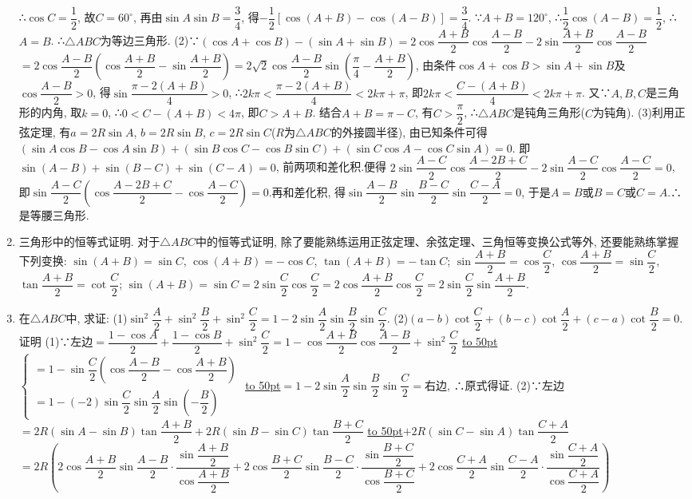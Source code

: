 \documentclass[10pt,a4paper]{article}
\newcommand{\blank}[1]{\underline{\hbox to #1pt{}}}
\begin{document}
\begin{enumerate}[1.]
∴$\cos C=\dfrac 12$, 故$C=60^{\circ }$, 再由$\sin A\sin B=\dfrac 34$, 得$-\dfrac 12[\cos (A+B)-\cos (A-B)]=\dfrac 34$.
∵$A+B=120^\circ$, ∴$\dfrac 12\cos (A-B)=\dfrac 12$, ∴$A=B$.
∴$\triangle ABC$为等边三角形.
(2)∵$(\cos A+\cos B)-(\sin A+\sin B)=2\cos \dfrac{A+B}2\cos \dfrac{A-B}2-2\sin \dfrac{A+B}2\cos \dfrac{A-B}2$
$=2\cos \dfrac{A-B}2(\cos \dfrac{A+B}2-\sin \dfrac{A+B}2)=2\sqrt 2\cos \dfrac{A-B}2\sin (\dfrac{\pi }4-\dfrac{A+B}2)$,
由条件$\cos A+\cos B>\sin A+\sin B$及$\cos \dfrac{A-B}2>0$, 得$\sin \dfrac{\pi -2(A+B)}4>0$,
∴$2k\pi <\dfrac{\pi -2(A+B)}4<2k\pi +\pi$, 即$2k\pi <\dfrac{C-(A+B)}4<2k\pi +\pi$.
又∵$A,B,C$是三角形的内角, 取$k=0$, ∴$0<C-(A+B)<4\pi$, 即$C>A+B$.
结合$A+B=\pi -C$, 有$C>\dfrac{\pi }2$, ∴$\triangle ABC$是钝角三角形($C$为钝角).
(3)利用正弦定理, 有$a=2R\sin A$, $b=2R\sin B$, $c=2R\sin C$($R$为$\triangle ABC$的外接圆半径), 由已知条件可得$(\sin A\cos B-\cos A\sin B)+(\sin B\cos C-\cos B\sin C)+(\sin C\cos A-\cos C\sin A)=0$.
即$\sin (A-B)+\sin (B-C)+\sin (C-A)=0$, 前两项和差化积.便得
$2\sin \dfrac{A-C}2\cos \dfrac{A-2B+C}2-2\sin \dfrac{A-C}2\cos \dfrac{A-C}2=0$,
即$\sin \dfrac{A-C}2(\cos \dfrac{A-2B+C}2-\cos \dfrac{A-C}2)=0$.再和差化积,
得$\sin \dfrac{A-B}2\sin \dfrac{B-C}2\sin \dfrac{C-A}2=0$, 于是$A=B$或$B=C$或$C=A$.∴是等腰三角形.
\item 三角形中的恒等式证明.
对于$\triangle ABC$中的恒等式证明, 除了要能熟练运用正弦定理、余弦定理、三角恒等变换公式等外, 还要能熟练掌握下列变换:
$\sin (A+B)=\sin C$, $\cos (A+B)=-\cos C$, $\tan (A+B)=-\tan C$;
$\sin \dfrac{A+B}2=\cos \dfrac C2$, $\cos \dfrac{A+B}2=\sin \dfrac C2$, $\tan \dfrac{A+B}2=\cot \dfrac C2$;
$\sin (A+B)=\sin C=2\sin \dfrac C2\cos \dfrac C2=2\cos \dfrac{A+B}2\cos \dfrac C2=2\sin \dfrac C2\sin \dfrac{A+B}2$.
\item 在$\triangle ABC$中, 求证:
(1)$\sin ^2\dfrac A2+\sin ^2\dfrac B2+\sin ^2\dfrac C2=1-2\sin \dfrac A2\sin \dfrac B2\sin \dfrac C2$.
(2)$(a-b)\cot \dfrac C2+(b-c)\cot \dfrac A2+(c-a)\cot \dfrac B2=0$.
证明  (1)∵左边$=\dfrac{1-\cos A}2+\dfrac{1-\cos B}2+\sin ^2\dfrac C2=1-\cos \dfrac{A+B}2\cos \dfrac{A-B}2+\sin ^2\dfrac C2$
\blank{50}$\begin{cases} =1-\sin \dfrac C2(\cos \dfrac{A-B}2-\cos \dfrac{A+B}2) \\ =1-(-2)\sin \dfrac C2\sin \dfrac A2\sin (-\dfrac B2) \end{cases}$
\blank{50}$=1-2\sin \dfrac A2\sin \dfrac B2\sin \dfrac C2=$右边,
∴原式得证.
(2)∵左边$=2R(\sin A-\sin B)\tan \dfrac{A+B}2+2R(\sin B-\sin C)\tan \dfrac{B+C}2$
\blank{50}$+2R(\sin C-\sin A)\tan \dfrac{C+A}2$
$=2R(2\cos \dfrac{A+B}2\sin \dfrac{A-B}2\cdot \dfrac{\sin \dfrac{A+B}2}{\cos \dfrac{A+B}2}+2\cos \dfrac{B+C}2\sin \dfrac{B-C}2\cdot \dfrac{\sin \dfrac{B+C}2}{\cos \dfrac{B+C}2}+2\cos \dfrac{C+A}2\sin \dfrac{C-A}2\cdot \dfrac{\sin \dfrac{C+A}2}{\cos \dfrac{C+A}2})$

\end{enumerate}
\end{document}
